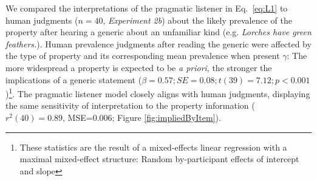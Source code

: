 \documentclass[10pt,letterpaper]{article}
\newcommand{\ndg}[1]{\textcolor{Green}{[ndg: #1]}}
\begin{document}
We compared the interpretations of the pragmatic listener in Eq.~\ref{eq:L1} to human judgments ($n=40$, {\it Experiment 2b}) about the likely prevalence of the property after hearing a generic about an unfamiliar kind (e.g. \emph{Lorches have green feathers.}). %
Human prevalence judgments after reading the generic were affected by the type of property and its corresponding mean prevalence when present $\gamma$: The more widespread a property is expected to be \emph{a priori}, the stronger the implications of a generic statement ($\beta = 0.57; SE = 0.08; t(39) = 7.12; p < 0.001$)\footnote{These statistics are the result of a mixed-effects linear regression with a maximal mixed-effect structure: Random by-participant effects of intercept and slope}. 
The pragmatic listener model closely aligns with human judgments, displaying the same sensitivity of interpretation to the property information ($r^2(40)=0.89$, MSE=0.006; Figure \ref{fig:impliedByItem}). 
\end{document}
